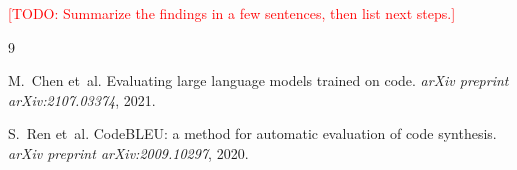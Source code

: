 \documentclass[11pt]{article}
\newcommand{\todo}[1]{\textcolor{red}{[TODO: #1]}}
\begin{document}
\todo{Summarize the findings in a few sentences, then list next steps.}

\begin{thebibliography}{9}

M.~Chen et~al.
\newblock Evaluating large language models trained on code.
\newblock \emph{arXiv preprint arXiv:2107.03374}, 2021.

S.~Ren et~al.
\newblock CodeBLEU: a method for automatic evaluation of code synthesis.
\newblock \emph{arXiv preprint arXiv:2009.10297}, 2020.

\end{thebibliography}
\end{document}
